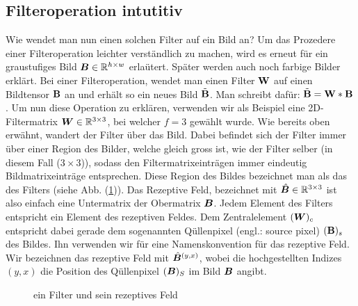 \subsection{Filteroperation intutitiv}\label{sec:filteroperation_intuitiv}
Wie wendet man nun einen solchen Filter auf ein Bild an? Um das Prozedere einer
Filteroperation leichter verständlich zu machen, wird es erneut für ein
graustufiges Bild $\bm{B} \in \mathbb{R}^{h \times w}$ erlaütert. Später werden auch noch farbige
Bilder erklärt.
\para{}
Bei einer Filteroperation, wendet man einen Filter $\mathbf{W}$ auf einen Bildtensor
$\mathbf{B}$ an und erhält so ein neues Bild $\tilde{\mathbf{B}}$. Man schreibt dafür:
$\tilde{\mathbf{B}} = \mathbf{W} * \mathbf{B}$.
\para{}
Um nun diese Operation zu erklären, verwenden wir als Beispiel eine
2D-Filtermatrix $\bm{W} \in \mathbb{R}^{3 \times 3}$, bei welcher
$f = 3$ gewählt wurde.
Wie bereits oben erwähnt, wandert der Filter über das Bild. Dabei befindet
sich der Filter immer über einer Region des Bilder, welche gleich gross ist,
wie der Filter selber (in diesem Fall ($3 \times 3$)), sodass den Filtermatrixeinträgen immer eindeutig
Bildmatrixeinträge entsprechen. Diese Region des Bildes bezeichnet man als das
 des Filters (siehe Abb. (\ref{fig:receptive_field})).
Das Rezeptive Feld, bezeichnet mit $\hat{\bm{B}} \in \mathbb{R}^{3 \times 3}$ ist also einfach eine
Untermatrix der Obermatrix $\bm{B}$.
\para{}
Jedem Element des Filters entspricht ein Element des rezeptiven Feldes. Dem
Zentralelement $(\bm{W})_c$ entspricht dabei gerade dem sogenannten Qüllenpixel
(engl.: source pixel) $(\mathbf{B})_s$ des Bildes. Ihn verwenden wir für eine
Namenskonvention für das rezeptive Feld. Wir bezeichnen das rezeptive Feld mit
$\hat{\bm{B}}^{(y,x)}$, wobei die hochgestellten Indizes $(y,x)$ die Position
des Qüllenpixel $(\bm{B})_S$ im Bild $\bm{B}$ angibt.

\begin{figure}[h!]

  \caption{ein Filter und sein rezeptives Feld}
  \label{fig:receptive_field}
\end{figure}

